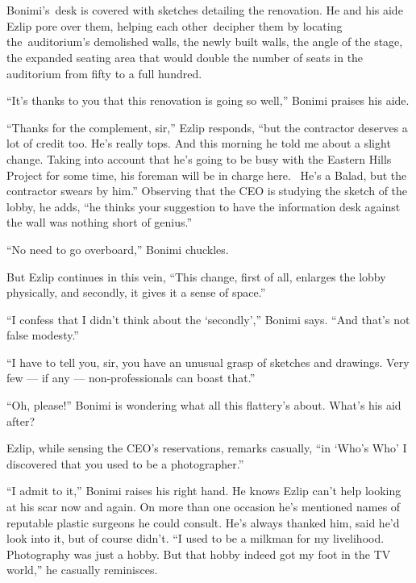 \documentclass[twoside,11pt]{book}
\begin{document}
\chapter{}

Bonimi's~desk is covered{ }with sketches detailing the renovation. He and his aide Ezlip pore over them,
helping each other~decipher them by locating the~auditorium's demolished walls, the newly built walls, the angle of the
stage, the expanded seating area that would double the number of seats in the auditorium from fifty to a
full{ }hundred.

{}``It's thanks to you that this renovation is going so well,'' Bonimi{ }praises his aide.

``Thanks for the complement, sir,'' Ezlip responds, ``but the contractor deserves
a lot of credit too. He's really tops. And this morning he told me about a slight change. Taking into account that he's
going to be busy with the Eastern Hills Project for some time, his foreman will be in charge here. ~He's a Balad, but
the contractor swears{ }by him.'' Observing that the CEO is studying the sketch of the
lobby, he adds, ``he thinks your suggestion to{ }have the information desk against the
wall was nothing short of genius.''

``No need to go overboard,'' Bonimi chuckles.

But Ezlip continues in this vein, ``This change, first of all, enlarges the lobby physically, and secondly,
it gives it a sense of space.''

``I confess that I didn't think about the `secondly','' Bonimi says. ``And that's
not false modesty.''

``I have to tell you, sir, you have an unusual grasp of sketches and drawings. Very few --- if any ---
non-professionals can boast that.''

``Oh, please!'' Bonimi is wondering what all this flattery's about. What's his aid after?

Ezlip, while sensing the CEO's reservations, remarks casually, ``in `Who's Who' I discovered that you used
to be a photographer.''

``I admit to it,'' Bonimi raises his right hand. He knows Ezlip can't help looking at his scar
now and again. On more than one occasion he's mentioned names of reputable{ }plastic surgeons he could
consult. He's always thanked him, said he'd look into it, but of course didn't. ``I used to be a milkman
for my livelihood. Photography was just a hobby. But that hobby indeed got my foot in the TV world,'' he
casually reminisces.
\end{document}
